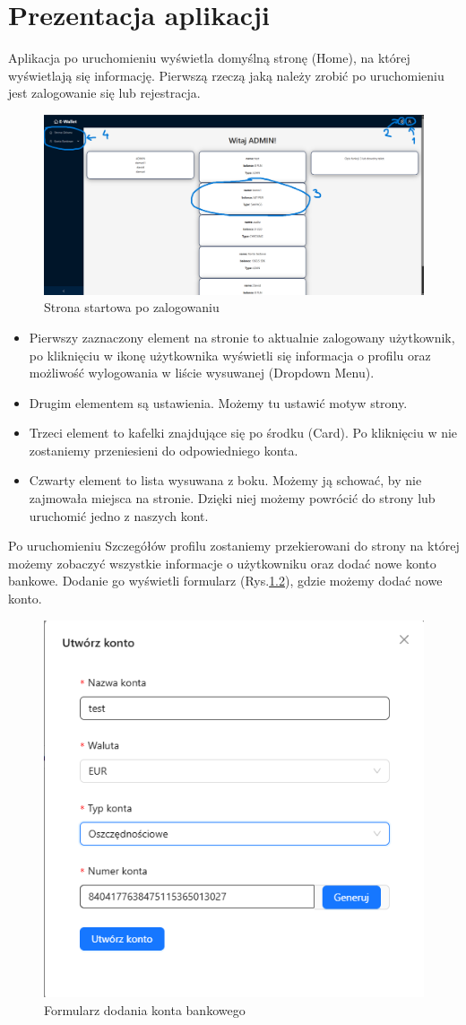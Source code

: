 \chapter{Prezentacja aplikacji}
Aplikacja po uruchomieniu wyświetla domyślną stronę (Home), na której wyświetlają się informację. Pierwszą rzeczą jaką należy zrobić po uruchomieniu jest zalogowanie się lub rejestracja.
\begin{figure}[H]
	\centering
	\includegraphics[width=0.7\linewidth]{images/HomePage}
	\caption{Strona startowa po zalogowaniu}
	\label{fig:homepage}
\end{figure}
\begin{itemize}
	\item Pierwszy zaznaczony element na stronie to aktualnie zalogowany użytkownik, po kliknięciu w ikonę użytkownika wyświetli się informacja o profilu oraz możliwość wylogowania w liście wysuwanej (Dropdown Menu).
	\item Drugim elementem są ustawienia. Możemy tu ustawić motyw strony.
	\item Trzeci element to kafelki znajdujące się po środku (Card). Po kliknięciu w nie zostaniemy przeniesieni do odpowiedniego konta.
	\item Czwarty element to lista wysuwana z boku. Możemy ją schować, by nie zajmowała miejsca na stronie. Dzięki niej możemy powrócić do strony lub uruchomić jedno z naszych kont.
\end{itemize}
Po uruchomieniu Szczegółów profilu zostaniemy przekierowani do strony na której możemy zobaczyć wszystkie informacje o użytkowniku oraz dodać nowe konto bankowe. Dodanie go wyświetli formularz (Rys.\ref{fig:accountform}), gdzie możemy dodać nowe konto.
\begin{figure}
	\centering
	\includegraphics[width=0.7\linewidth]{images/AccountForm}
	\caption{Formularz dodania konta bankowego}
	\label{fig:accountform}
\end{figure}
